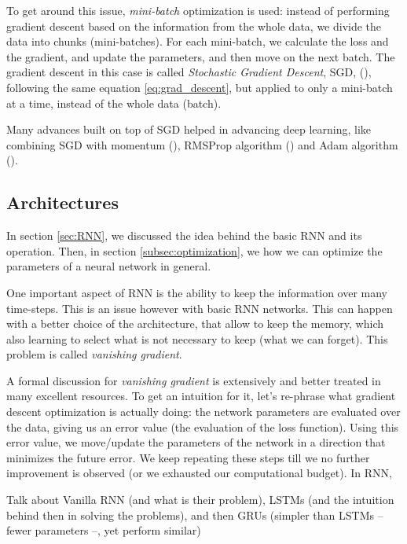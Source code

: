 \par To get around this issue, \textit{mini-batch} optimization is used: instead of performing gradient descent based on the information from the whole data, we divide the data into chunks (mini-batches). For each mini-batch, we calculate the loss and the gradient, and update the parameters, and then move on the next batch. The gradient descent in this case is called \textit{Stochastic Gradient Descent}, SGD, (\citep{robbins1951stochastic}), following the same equation \ref{eq:grad_descent}, but applied to only a mini-batch at a time, instead of the whole data (batch).

\par Many advances built on top of SGD helped in advancing deep learning, like combining SGD with momentum (\citep{rumelhart1988learning}), RMSProp algorithm (\citep{hinton2012neural}) and Adam algorithm (\citep{kingma2014adam}).

\subsection{Architectures}

In section \ref{sec:RNN}, we discussed the idea behind the basic RNN and its operation. Then, in section \ref{subsec:optimization}, we how we can optimize the parameters of a neural network in general.

\par One important aspect of RNN is the ability to keep the information over many time-steps. This is an issue however with basic RNN networks. This can happen with a better choice of the architecture, that allow to keep the memory, which also learning to select what is not necessary to keep (what we can forget). This problem is called \textit{vanishing gradient}.

A formal discussion for \textit{vanishing gradient} is extensively and better treated in many excellent resources. To get an intuition for it, let's re-phrase what gradient descent optimization is actually doing: the network parameters are evaluated over the data, giving us an error value (the evaluation of the loss function). Using this error value, we move/update the parameters of the network in a direction that minimizes the future error. We keep repeating these steps till we no further improvement is observed (or we exhausted our computational budget). In RNN,

Talk about Vanilla RNN (and what is their problem), LSTMs (and the intuition behind then in solving the problems), and then GRUs (simpler than LSTMs -- fewer parameters --, yet perform similar)

